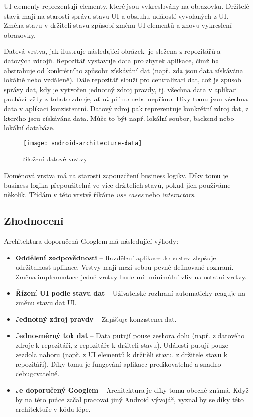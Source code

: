 \noindent UI elementy reprezentují elementy, které jsou vykreslovány na obrazovku. Držitelé stavů mají na starosti správu stavu UI a obsluhu událostí vyvolaných z UI. Změna stavu v držiteli stavu způsobí změnu UI elementů a znovu vykreslení obrazovky. 

Datová vrstva, jak ilustruje následující obrázek, je složena z repozitářů a datových zdrojů. Repozitář vystavuje data pro zbytek aplikace, čímž ho abstrahuje od konkrétního způsobu získávání dat (např. zda jsou data získávána lokálně nebo vzdáleně). Dále repozitář slouží pro centralizaci dat, což je způsob správy dat, kdy je vytvořen jednotný zdroj pravdy, tj. všechna data v aplikaci pochází vždy z tohoto zdroje, ať už přímo nebo nepřímo. Díky tomu jsou všechna data v aplikaci konzistentní. Datový zdroj pak reprezentuje konkrétní zdroj dat, z kterého jsou získávána data. Může to být např. lokální soubor, backend nebo lokální databáze. 

\begin{figure}[H]
	\centering
	
	\texttt{[image: android-architecture-data]}
	
	\caption{Složení datové vrstvy \cite{android-architecture}}
	\label{fig:android-architecture-data}
\end{figure}

\noindent Doménová vrstva má na starosti zapouzdření business logiky. Díky tomu je business logika přepoužitelná ve více držitelích stavů, pokud jich používáme několik. Třídám v této vrstvě říkáme \textit{use cases} nebo \textit{interactors}.

\subsection{Zhodnocení}
Architektura doporučená Googlem má následující výhody:

\begin{itemize}
	\item \textbf{Oddělení zodpovědnosti} -- Rozdělení aplikace do vrstev zlepšuje udržitelnost aplikace.  Vrstvy mají mezi sebou pevně definované rozhraní. Změna implementace jedné vrstvy bude mít minimální vliv na ostatní vrstvy.

	\item \textbf{Řízení UI podle stavu dat} -- Uživatelské rozhraní automaticky reaguje na změnu stavu dat UI. 

	\item \textbf{Jednotný zdroj pravdy} -- Zajišťuje konzistenci dat.

	\item \textbf{Jednosměrný tok dat} -- Data putují pouze zeshora dolu (např. z datového zdroje k repozitáři, z repozitáře k držiteli stavu). Události putují pouze zezdola nahoru (např. z UI elementů k držitěli stavu, z držitele stavu k repozitáři). Díky tomu je fungování aplikace predikovatelné a snadno debugovatelné.

	\item \textbf{Je doporučený Googlem} -- Architektura je díky tomu obecně známá. Když by na této práce začal pracovat jiný Android vývojář, vyznal by se díky této architektuře v kódu lépe.
\end{itemize}

